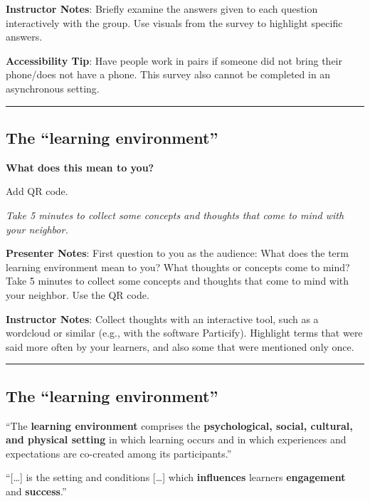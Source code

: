 \documentclass[
  letterpaper,
  DIV=11,
  numbers=noendperiod]{scrartcl}
\begin{document}
\textbf{Instructor Notes}: Briefly examine the answers given to each
question interactively with the group. Use visuals from the survey to
highlight specific answers.

\textbf{Accessibility Tip}: Have people work in pairs if someone did not
bring their phone/does not have a phone. This survey also cannot be
completed in an asynchronous setting.

\begin{center}\rule{0.5\linewidth}{0.5pt}\end{center}

\subsection{The ``learning
environment''}\label{the-learning-environment}

\textbf{What does this mean to you?}

Add QR code.

\emph{Take 5 minutes to collect some concepts and thoughts that come to
mind with your neighbor.}

\textbf{Presenter Notes}: First question to you as the audience: What
does the term learning environment mean to you? What thoughts or
concepts come to mind? Take 5 minutes to collect some concepts and
thoughts that come to mind with your neighbor. Use the QR code.

\textbf{Instructor Notes}: Collect thoughts with an interactive tool,
such as a wordcloud or similar (e.g., with the software Particify).
Highlight terms that were said more often by your learners, and also
some that were mentioned only once.

\begin{center}\rule{0.5\linewidth}{0.5pt}\end{center}

\subsection{The ``learning
environment''}\label{the-learning-environment-1}

``The \textbf{learning environment} comprises the \textbf{psychological,
social, cultural, and physical setting} in which learning occurs and in
which experiences and expectations are co-created among its
participants.''

``{[}\ldots{]} is the setting and conditions {[}\ldots{]} which
\textbf{influences} learners \textbf{engagement} and \textbf{success}.''
\end{document}
